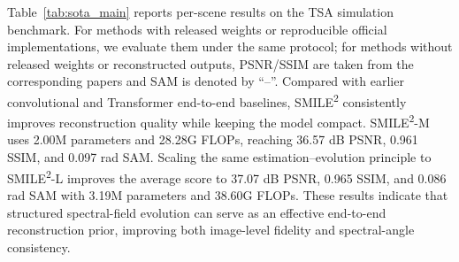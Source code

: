 \documentclass[letterpaper]{article} %
\newcommand{\smiletwo}{SMILE\textsuperscript{2}}
\begin{document}
Table~\ref{tab:sota_main} reports per-scene results on the TSA simulation benchmark.
For methods with released weights or reproducible official implementations, we evaluate them under the same protocol; for methods without released weights or reconstructed outputs, PSNR/SSIM are taken from the corresponding papers and SAM is denoted by ``--''.
Compared with earlier convolutional and Transformer end-to-end baselines, \smiletwo{} consistently improves reconstruction quality while keeping the model compact.
\smiletwo-M uses 2.00M parameters and 28.28G FLOPs, reaching 36.57 dB PSNR, 0.961 SSIM, and 0.097 rad SAM.
Scaling the same estimation--evolution principle to \smiletwo-L improves the average score to 37.07 dB PSNR, 0.965 SSIM, and 0.086 rad SAM with 3.19M parameters and 38.60G FLOPs.
These results indicate that structured spectral-field evolution can serve as an effective end-to-end reconstruction prior, improving both image-level fidelity and spectral-angle consistency.
\end{document}
